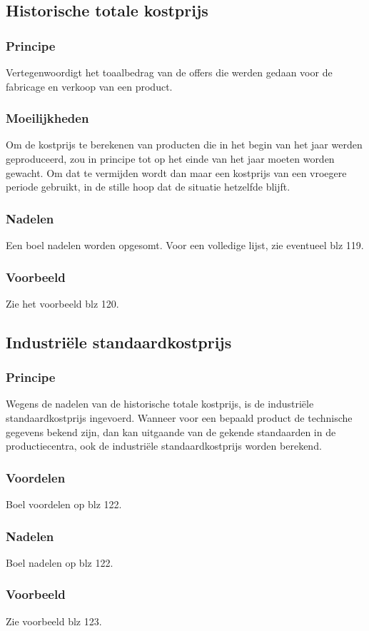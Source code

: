 \documentclass[12pt]{article}
\begin{document}
\subsection{Historische totale kostprijs}
\subsubsection{Principe}
Vertegenwoordigt het toaalbedrag van de offers die werden gedaan voor de fabricage en verkoop van een product.
\subsubsection{Moeilijkheden}
Om de kostprijs te berekenen van producten die in het begin van het jaar werden geproduceerd, zou in principe tot op het einde van het jaar moeten worden gewacht. Om dat te vermijden wordt dan maar een kostprijs van een vroegere periode gebruikt, in de stille hoop dat de situatie hetzelfde blijft.
\subsubsection{Nadelen}
Een boel nadelen worden opgesomt. Voor een volledige lijst, zie eventueel blz 119.
\subsubsection{Voorbeeld}
Zie het voorbeeld blz 120.
\subsection{Industri\"ele standaardkostprijs}
\subsubsection{Principe}
Wegens de nadelen van de historische totale kostprijs, is de industri\"ele standaardkostprijs ingevoerd. Wanneer voor een bepaald product de technische gegevens bekend zijn, dan kan uitgaande van de gekende standaarden in de productiecentra, ook de industri\"ele standaardkostprijs worden berekend.
\subsubsection{Voordelen}
Boel voordelen op blz 122.
\subsubsection{Nadelen}
Boel nadelen op blz 122.
\subsubsection{Voorbeeld}
Zie voorbeeld blz 123.
\end{document}
